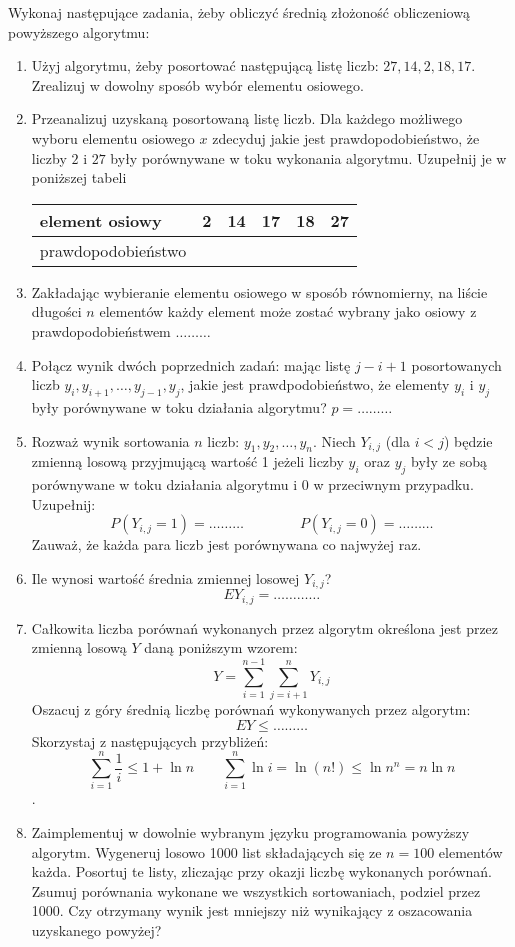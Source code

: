 \documentclass{mwart}
\begin{document}
Wykonaj następujące zadania, żeby obliczyć średnią złożoność obliczeniową powyższego algorytmu:
\begin{enumerate}
\item Użyj algorytmu, żeby posortować następującą listę liczb: $27, 14, 2, 18, 17$. Zrealizuj w dowolny sposób wybór elementu osiowego.
\item Przeanalizuj uzyskaną posortowaną listę liczb.
Dla każdego możliwego wyboru elementu osiowego $x$ zdecyduj jakie jest prawdopodobieństwo, że liczby $2$ i $27$ były porównywane w toku wykonania algorytmu.
Uzupełnij je w poniższej tabeli\\
\begin{tabular}{l|p{1cm}|p{1cm}|p{1cm}|p{1cm}|p{1cm}}
element osiowy & 2 & 14 & 17 & 18 & 27 \\
\hline
prawdopodobieństwo & & & & &
\end{tabular}
\item Zakładając wybieranie elementu osiowego w sposób równomierny, na liście długości $n$ elementów każdy element może zostać wybrany jako osiowy z prawdopodobieństwem $\ldots\ldots\ldots$
\item Połącz wynik dwóch poprzednich zadań: mając listę $j-i+1$ posortowanych liczb $y_i, y_{i+1}, \ldots, y_{j-1}, y_j$, jakie jest prawdpodobieństwo, że elementy $y_i$ i $y_j$ były porównywane w toku działania algorytmu? $p=\ldots\ldots\ldots$
\item Rozważ wynik sortowania $n$ liczb: $y_1, y_2, \ldots, y_n$.
Niech $Y_{i,j}$ (dla $i<j$) będzie zmienną losową przyjmującą wartość 1 jeżeli liczby $y_i$ oraz $y_j$ były ze sobą porównywane w toku działania algorytmu i 0 w przeciwnym przypadku. Uzupełnij:
\[ P(Y_{i,j}=1)=\ldots\ldots\ldots \qquad\qquad P(Y_{i,j}=0)=\ldots\ldots\ldots \]
Zauważ, że każda para liczb jest porównywana co najwyżej raz.
\item Ile wynosi wartość średnia zmiennej losowej $Y_{i,j}$?
\[ EY_{i,j}=\ldots\ldots\ldots\ldots \]
\item Całkowita liczba porównań wykonanych przez algorytm określona jest przez zmienną losową $Y$ daną poniższym wzorem:
\[ Y=\sum_{i=1}^{n-1}\sum_{j=i+1}^n Y_{i,j} \]
Oszacuj z góry średnią liczbę porównań wykonywanych przez algorytm:
\[ EY\leq\ldots\ldots\ldots \]
Skorzystaj z następujących przybliżeń: 
\[\sum_{i=1}^n \frac{1}{i}\leq 1+\ln n \qquad \sum_{i=1}^n \ln i = \ln (n!) \leq \ln n^n = n\ln n\].
\item Zaimplementuj w dowolnie wybranym języku programowania powyższy algorytm. Wygeneruj losowo 1000 list składających się ze $n=100$ elementów każda.
Posortuj te listy, zliczając przy okazji liczbę wykonanych porównań.
Zsumuj porównania wykonane we wszystkich sortowaniach, podziel przez 1000. Czy otrzymany wynik jest mniejszy niż wynikający z oszacowania uzyskanego powyżej?
\end{enumerate}
\end{document}
